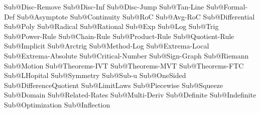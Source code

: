 Sub@Disc-Remove 			%
Sub@Disc-Inf				%
Sub@Disc-Jump				%
Sub@Tan-Line				%
Sub@Formal-Def				%
Sub@Asymptote				%
Sub@Continuity				%
Sub@RoC						%
Sub@Avg-RoC					%
Sub@Differential			%
Sub@Poly					%
Sub@Radical					%
Sub@Rational				%
Sub@Exp						%
Sub@Log						%
Sub@Trig					%
Sub@Power-Rule				%
Sub@Chain-Rule				%
Sub@Product-Rule			%
Sub@Quotient-Rule			%
Sub@Implicit				%
Sub@Arctrig					%
Sub@Method-Log				%
Sub@Extrema-Local			%
Sub@Extrema-Absolute		%
Sub@Critical-Number			%
Sub@Sign-Graph				%
Sub@Riemann					%
Sub@Motion					%
Sub@Theorems-IVT			%
Sub@Theorems-MVT			%
Sub@Theorems-FTC			%
Sub@LHopital				%
Sub@Symmetry				%
Sub@Sub-u					%
Sub@OneSided				%
Sub@DifferenceQuotient		%
Sub@LimitLaws				%
Sub@Piecewise				%
Sub@Squeeze					%
Sub@Domain					%
Sub@Related-Rates			%
Sub@Multi-Deriv				%
Sub@Definite				%
Sub@Indefinite				%
Sub@Optimization			%
Sub@Inflection				%






